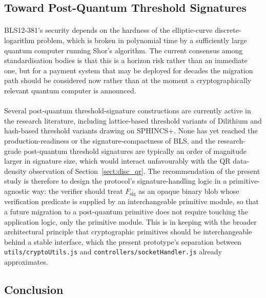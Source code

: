 \subsection{Toward Post-Quantum Threshold Signatures}
\label{sect:rec_pqc}

\paragraph{}BLS12-381's security depends on the hardness of the elliptic-curve discrete-logarithm problem, which is broken in polynomial time by a sufficiently large quantum computer running Shor's algorithm. The current consensus among standardisation bodies is that this is a horizon risk rather than an immediate one, but for a payment system that may be deployed for decades the migration path should be considered now rather than at the moment a cryptographically relevant quantum computer is announced.

\paragraph{}Several post-quantum threshold-signature constructions are currently active in the research literature, including lattice-based threshold variants of Dilithium and hash-based threshold variants drawing on SPHINCS+. None has yet reached the production-readiness or the signature-compactness of BLS, and the research-grade post-quantum threshold signatures are typically an order of magnitude larger in signature size, which would interact unfavourably with the QR data-density observation of Section~\ref{sect:disc_qr}. The recommendation of the present study is therefore to design the protocol's signature-handling logic in a primitive-agnostic way: the verifier should treat $F_{\text{sig}}$ as an opaque binary blob whose verification predicate is supplied by an interchangeable primitive module, so that a future migration to a post-quantum primitive does not require touching the application logic, only the primitive module. This is in keeping with the broader architectural principle that cryptographic primitives should be interchangeable behind a stable interface, which the present prototype's separation between \texttt{utils/cryptoUtils.js} and \texttt{controllers/socketHandler.js} already approximates.

\subsection{Conclusion}
\label{sect:conclusion}

